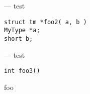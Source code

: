 \endmanpage
\startmanpage
{}
--- test  
\startvb\begin{verbatim}
struct tm *foo2( a, b )
MyType *a;
short b;
\end{verbatim}
\endvb

\endmanpage
\startmanpage
{}
--- test 
\startvb\begin{verbatim}
int foo3()
\end{verbatim}
\endvb

foo
\endmanpage
